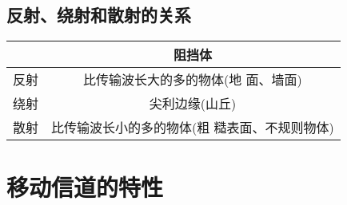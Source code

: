\subsection{反射、绕射和散射的关系}
\begin{tabular}{|c|c|}
	\hline
		&阻挡体	\\
		\hline
		反射	&	比传输波长大的多的物体(地
		面、墙面)	\\
				\hline
		绕射	&	尖利边缘(山丘)\\
				\hline
		散射	&	比传输波长小的多的物体(粗
		糙表面、不规则物体)	\\
				\hline
\end{tabular}

\section{移动信道的特性
}













